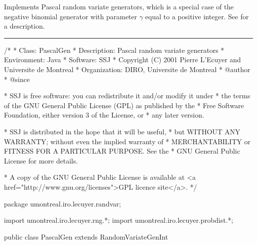 
Implements Pascal random variate generators, which is a special case of the
negative binomial generator with parameter $\gamma$ equal to a positive integer.
See  for a description.


\bigskip\hrule

\begin{code}
\begin{hide}
/*
 * Class:        PascalGen
 * Description:  Pascal random variate generators
 * Environment:  Java
 * Software:     SSJ 
 * Copyright (C) 2001  Pierre L'Ecuyer and Universite de Montreal
 * Organization: DIRO, Universite de Montreal
 * @author       
 * @since

 * SSJ is free software: you can redistribute it and/or modify it under
 * the terms of the GNU General Public License (GPL) as published by the
 * Free Software Foundation, either version 3 of the License, or
 * any later version.

 * SSJ is distributed in the hope that it will be useful,
 * but WITHOUT ANY WARRANTY; without even the implied warranty of
 * MERCHANTABILITY or FITNESS FOR A PARTICULAR PURPOSE.  See the
 * GNU General Public License for more details.

 * A copy of the GNU General Public License is available at
   <a href="http://www.gnu.org/licenses">GPL licence site</a>.
 */
\end{hide}
package umontreal.iro.lecuyer.randvar;\begin{hide}
import umontreal.iro.lecuyer.rng.*;
import umontreal.iro.lecuyer.probdist.*;
\end{hide}

public class PascalGen extends RandomVariateGenInt \begin{hide} {
   protected int    n;
   protected double p;    
\end{hide}
\end{code}

